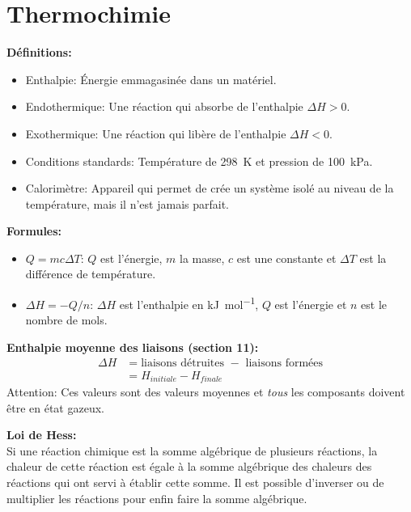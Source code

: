 \documentclass[french, a4paper, 12pt]{article}
\begin{document}
\section{Thermochimie}
\textbf{Définitions:}
\begin{itemize}
\item Enthalpie: Énergie emmagasinée dans un matériel.
\item Endothermique: Une réaction qui absorbe de l'enthalpie $\Delta H > 0$.
\item Exothermique: Une réaction qui libère de l'enthalpie $\Delta H < 0$.
\item Conditions standards: Température de \SI{298}{K} et pression de \SI{100}{kPa}.
\item Calorimètre: Appareil qui permet de crée un système isolé au niveau de la température, mais il n'est jamais parfait.
\end{itemize}
\vspace{0.5em}
\textbf{Formules:}
\begin{itemize}
\item $Q=mc\Delta T$: $Q$ est l'énergie, $m$ la masse, $c$ est une constante et $\Delta T$ est la différence de température.
\item $\Delta H = -Q/n$: $\Delta H$ est l'enthalpie en \si{kJ.mol^{-1}}, $Q$ est l'énergie et $n$ est le nombre de mols.
\end{itemize}
\vspace{0.5em}
\textbf{Enthalpie moyenne des liaisons (section 11):}
\begin{align*}
\Delta H &= \text{liaisons détruites }-\text{ liaisons formées}\\
&=H_{initiale} - H_{finale}
\end{align*}
Attention: Ces valeurs sont des valeurs moyennes et \emph{tous} les composants doivent être en état gazeux.

\vspace{0.5em}
\textbf{Loi de Hess:}\\
Si une réaction chimique est la somme algébrique de plusieurs réactions, la chaleur de cette réaction est égale à la somme algébrique des chaleurs des réactions qui ont servi à établir cette somme. Il est possible d'inverser ou de multiplier les réactions pour enfin faire la somme algébrique.
\end{document}
